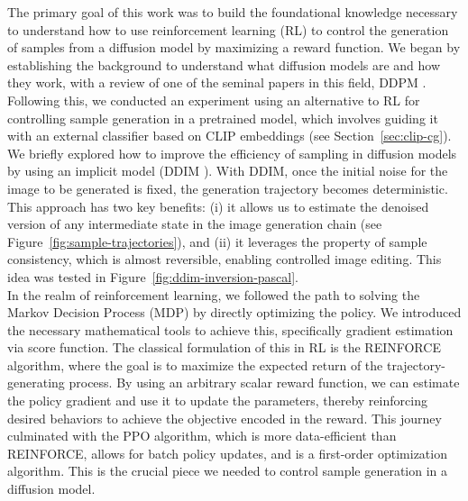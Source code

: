 The primary goal of this work was to build the foundational knowledge necessary to understand how to use reinforcement learning (RL) to control the generation of samples from a diffusion model by maximizing a reward function. We began by establishing the background to understand what diffusion models are and how they work, with a review of one of the seminal papers in this field, DDPM \cite{ho2020denoising}. Following this, we conducted an experiment using an alternative to RL for controlling sample generation in a pretrained model, which involves guiding it with an external classifier based on CLIP embeddings (see Section~\ref{sec:clip-cg}). \\

\noindent We briefly explored how to improve the efficiency of sampling in diffusion models by using an implicit model (DDIM \cite{song2020denoising}). With DDIM, once the initial noise for the image to be generated is fixed, the generation trajectory becomes deterministic. This approach has two key benefits: (i) it allows us to estimate the denoised version of any intermediate state in the image generation chain (see Figure~\ref{fig:sample-trajectories}), and (ii) it leverages the property of sample consistency, which is almost reversible, enabling controlled image editing. This idea was tested in Figure~\ref{fig:ddim-inversion-pascal}. \\

\noindent In the realm of reinforcement learning, we followed the path to solving the Markov Decision Process (MDP) by directly optimizing the policy. We introduced the necessary mathematical tools to achieve this, specifically gradient estimation via score function. The classical formulation of this in RL is the REINFORCE algorithm, where the goal is to maximize the expected return of the trajectory-generating process. By using an arbitrary scalar reward function, we can estimate the policy gradient and use it to update the parameters, thereby reinforcing desired behaviors to achieve the objective encoded in the reward. This journey culminated with the PPO algorithm, which is more data-efficient than REINFORCE, allows for batch policy updates, and is a first-order optimization algorithm. This is the crucial piece we needed to control sample generation in a diffusion model. \\

